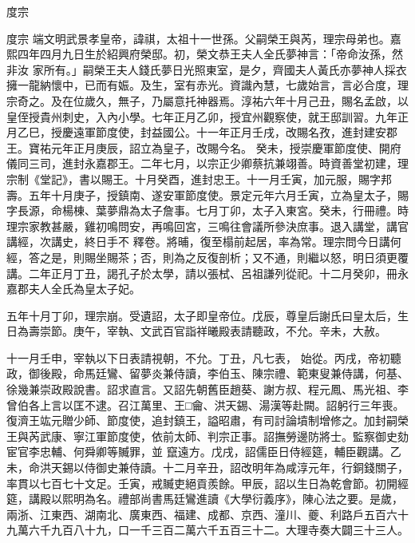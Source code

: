 
\begin{pinyinscope}

 度宗



 度宗
 端文明武景孝皇帝，諱祺，太祖十一世孫。父嗣榮王與芮，理宗母弟也。嘉熙四年四月九日生於紹興府榮邸。初，榮文恭王夫人全氏夢神言：「帝命汝孫，然非汝
 家所有。」嗣榮王夫人錢氏夢日光照東室，是夕，齊國夫人黃氏亦夢神人採衣擁一龍納懷中，已而有娠。及生，室有赤光。資識內慧，七歲始言，言必合度，理宗奇之。及在位歲久，無子，乃屬意托神器焉。淳祐六年十月己丑，賜名孟啟，以皇侄授貴州刺史，入內小學。七年正月乙卯，授宜州觀察使，就王邸訓習。九年正月乙巳，授慶遠軍節度使，封益國公。十一年正月壬戌，改賜名孜，進封建安郡王。寶祐元年正月庚辰，詔立為皇子，改賜今名。
 癸未，授崇慶軍節度使、開府儀同三司，進封永嘉郡王。二年七月，以宗正少卿蔡抗兼翊善。時資善堂初建，理宗制《堂記》，書以賜王。十月癸酉，進封忠王。十一月壬寅，加元服，賜字邦壽。五年十月庚子，授鎮南、遂安軍節度使。景定元年六月壬寅，立為皇太子，賜字長源，命楊棟、葉夢鼎為太子詹事。七月丁卯，太子入東宮。癸未，行冊禮。時理宗家教甚嚴，雞初鳴問安，再鳴回宮，三鳴往會議所參決庶事。退入講堂，講官講經，次講史，終日手不
 釋卷。將晡，復至榻前起居，率為常。理宗問今日講何經，答之是，則賜坐賜茶；否，則為之反復剖析；又不通，則繼以怒，明日須更覆講。二年正月丁丑，謁孔子於太學，請以張栻、呂祖謙列從祀。十二月癸卯，冊永嘉郡夫人全氏為皇太子妃。



 五年十月丁卯，理宗崩。受遺詔，太子即皇帝位。戊辰，尊皇后謝氏曰皇太后，生日為壽崇節。庚午，宰執、文武百官詣祥曦殿表請聽政，不允。辛未，大赦。



 十一月壬申，宰執以下日表請視朝，不允。丁丑，凡七表，
 始從。丙戌，帝初聽政，御後殿，命馬廷鸞、留夢炎兼侍讀，李伯玉、陳宗禮、範東叟兼侍講，何基、徐幾兼崇政殿說書。詔求直言。又詔先朝舊臣趙葵、謝方叔、程元鳳、馬光祖、李曾伯各上言以匡不逮。召江萬里、王□龠、洪天錫、湯漢等赴闕。詔躬行三年喪。復濟王竑元贈少師、節度使，追封鎮王，謚昭肅，有司討論墳制增修之。加封嗣榮王與芮武康、寧江軍節度使，依前太師、判宗正事。詔撫勞邊防將士。監察御史劾宦官李忠輔、何舜卿等贓罪，並
 竄遠方。戊戌，詔儒臣日侍經筵，輔臣觀講。乙未，命洪天錫以侍御史兼侍讀。十二月辛丑，詔改明年為咸淳元年，行銅錢關子，率貫以七百七十文足。壬寅，戒贓吏絕貢羨餘。甲辰，詔以生日為乾會節。初開經筵，講殿以熙明為名。禮部尚書馬廷鸞進讀《大學衍義序》，陳心法之要。是歲，兩浙、江東西、湖南北、廣東西、福建、成都、京西、潼川、夔、利路戶五百六十九萬六千九百八十九，口一千三百二萬六千五百三十二。大理寺奏大闢三十三人。




\end{pinyinscope}
